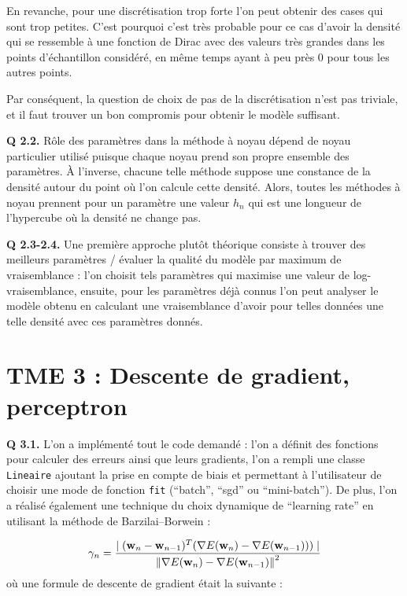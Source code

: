 \documentclass[a4paper,11pt]{article}
\theoremstyle{plain}
\theoremstyle{definition}
\newcommand\norm[1]{\left\lVert#1\right\rVert}
\begin{document}
En revanche, pour une discrétisation trop forte l'on peut obtenir des cases qui sont trop petites. C'est pourquoi c'est très probable pour ce cas d'avoir la densité qui se ressemble à une fonction de Dirac avec des valeurs très grandes dans les points d'échantillon considéré, en même temps ayant à peu près 0 pour tous les autres points.

Par conséquent, la question de choix de pas de la discrétisation n'est pas triviale, et il faut trouver un bon compromis pour obtenir le modèle suffisant.

\textbf{Q 2.2.} Rôle des paramètres dans la méthode à noyau dépend de noyau particulier utilisé puisque chaque noyau prend son propre ensemble des paramètres. À l'inverse, chacune telle méthode suppose une constance de la densité autour du point où l'on calcule cette densité. Alors, toutes les méthodes à noyau prennent pour un paramètre une valeur $h_n$ qui est une longueur de l'hypercube où la densité ne change pas.

\textbf{Q 2.3-2.4.} Une première approche plutôt théorique consiste à trouver des meilleurs paramètres / évaluer la qualité du modèle par maximum de vraisemblance : l'on choisit tels paramètres qui maximise une valeur de log-vraisemblance, ensuite, pour les paramètres déjà connus l'on peut analyser le modèle obtenu en calculant une vraisemblance d'avoir pour telles données une telle densité avec ces paramètres donnés.

\section{TME 3 : Descente de gradient, perceptron}
\label{tme3}

\textbf{Q 3.1.} L'on a implémenté tout le code demandé : l'on a définit des fonctions pour calculer des erreurs ainsi que leurs gradients, l'on a rempli une classe \texttt{Lineaire} ajoutant la prise en compte de biais et permettant à l'utilisateur de choisir une mode de fonction \texttt{fit} (``batch'', ``sgd'' ou ``mini-batch''). De plus, l'on a réalisé également une technique du choix dynamique de ``learning rate'' en utilisant la méthode de Barzilai–Borwein :

\begin{equation}
    \gamma_n = \frac{\mid (\text{\textbf{w}}_n - \text{\textbf{w}}_{n-1})^T (\nabla E(\text{\textbf{w}}_n) - \nabla E(\text{\textbf{w}}_{n-1}))) \mid}{\norm{\nabla E(\text{\textbf{w}}_n) - \nabla E(\text{\textbf{w}}_{n-1})}^2}
\end{equation}
où une formule de descente de gradient était la suivante :
\end{document}
